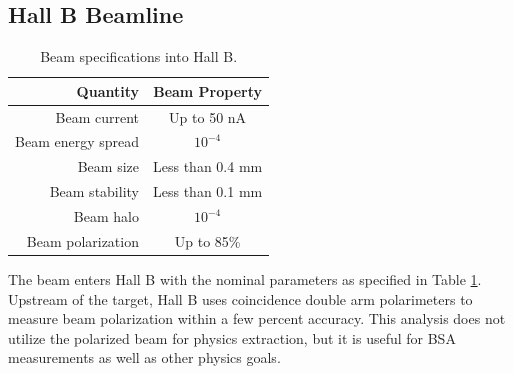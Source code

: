     \clearpage
    \subsection{Hall B Beamline}

        \begin{table}[h]
                \centering
                \begin{tabular}{rc}
                    Quantity  & Beam Property \\\hline
                    Beam current  & Up to 50 nA \\
                    Beam energy spread  & $10^{-4}$ \\
                    Beam size  & Less than 0.4 mm \\
                    Beam stability  & Less than 0.1 mm \\
                    Beam halo & $10^{-4}$ \\
                    Beam polarization & Up to 85\% \\
                \end{tabular}
            \caption{Beam specifications into Hall B.}
            \label{table:beam-properties}
        \end{table}
        
        The beam enters Hall B with the nominal parameters as specified in Table \ref{table:beam-properties}. Upstream of the target, Hall B uses coincidence double arm \Moller polarimeters  to measure beam polarization within a few percent accuracy. This analysis does not utilize the polarized beam for physics extraction, but it is useful for BSA measurements as well as other physics goals. 
    

